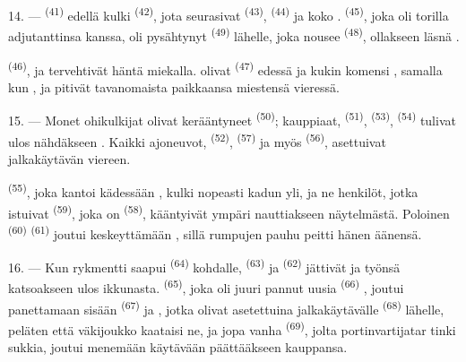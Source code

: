 \VUsaut{3.0mm}

14. ---  \textsuperscript{(41)} edellä kulki
 \textsuperscript{(42)}, jota seurasivat
 \textsuperscript{(43)}, 
\textsuperscript{(44)} ja koko . 
\textsuperscript{(45)}, joka oli torilla adjutanttinsa kanssa, oli pysähtynyt
 \textsuperscript{(49)} lähelle, joka nousee
 \textsuperscript{(48)}, ollakseen läsnä
.

 \textsuperscript{(46)},  ja
 tervehtivät häntä miekalla.  olivat
 \textsuperscript{(47)} edessä ja kukin
 komensi , samalla kun
,  ja  pitivät
tavanomaista paikkaansa miestensä vieressä.

15. --- Monet ohikulkijat olivat kerääntyneet 
\textsuperscript{(50)}; kauppiaat, 
\textsuperscript{(51)},  \textsuperscript{(53)},
 \textsuperscript{(54)} tulivat ulos nähdäkseen
. Kaikki ajoneuvot, 
\textsuperscript{(52)},  \textsuperscript{(57)} ja myös
 \textsuperscript{(56)}, asettuivat jalkakäytävän
viereen.

\VUsaut{3.0mm}

 \textsuperscript{(55)}, joka kantoi kädessään
, kulki nopeasti kadun yli, ja ne henkilöt, jotka
istuivat  \textsuperscript{(59)}, joka on
 \textsuperscript{(58)}, kääntyivät ympäri nauttiakseen
näytelmästä. Poloinen  \textsuperscript{(60)}
 \textsuperscript{(61)} joutui keskeyttämään
, sillä rumpujen pauhu peitti hänen äänensä.

16. --- Kun rykmentti saapui  \textsuperscript{(64)}
kohdalle,  \textsuperscript{(63)} ja 
\textsuperscript{(62)} jättivät  ja työnsä katsoakseen
ulos ikkunasta.  \textsuperscript{(65)}, joka oli juuri
pannut uusia  \textsuperscript{(66)} ,
joutui panettamaan sisään  \textsuperscript{(67)} ja
, jotka olivat asetettuina jalkakäytävälle
 \textsuperscript{(68)} lähelle, peläten että väkijoukko
kaataisi ne, ja jopa vanha  \textsuperscript{(69)},
jolta portinvartijatar tinki sukkia, joutui menemään käytävään päättääkseen
kauppansa.

